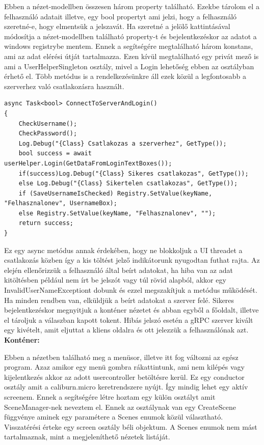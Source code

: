 \documentclass[
]{thesis-ekf}
\theoremstyle{definition}
\theoremstyle{remark}
\begin{document}
Ebben a nézet-modellben összesen három property található. Ezekbe tárolom el a felhasználó adatait illetve, egy bool propertyt ami jelzi, hogy a felhasználó szeretné-e, hogy elmentsük a jelszavát. Ha szeretné a jelölő kattintásával módosítja a nézet-modellben található property-t és bejelentkezéskor az adatot a windows registrybe mentem. Ennek a segítségére megtalálható három konstans, ami az adat elérési útját tartalmazza. Ezen kívül megtalálható egy privát mező is ami a UserHelperSingleton osztály, mivel a Login lehetőség ebben az osztályban érhető el. Több metódus is a rendelkezésünkre áll ezek közül a legfontosabb a szerverhez való csatlakozásra használt.

\begin{lstlisting}[caption={Bejelentkezés},captionpos=b]
async Task<bool> ConnectToServerAndLogin()
{
	CheckUsername();
	CheckPassword();
	Log.Debug("{Class} Csatlakozas a szerverhez", GetType());
	bool success = await userHelper.Login(GetDataFromLoginTextBoxes());
	if(success)Log.Debug("{Class} Sikeres csatlakozas", GetType());
	else Log.Debug("{Class} Sikertelen csatlakozas", GetType());
	if (SaveUsernameIsChecked) Registry.SetValue(keyName, "Felhasznalonev", UsernameBox);
	else Registry.SetValue(keyName, "Felhasznalonev", "");
	return success;
}
\end{lstlisting}
Ez egy async metódus annak érdekében, hogy ne blokkoljuk a UI threadet a csatlakozás közben így a kis töltést jelző indikátorunk nyugodtan futhat rajta. Az elején ellenőrizzük a felhasználó által beírt adatokat, ha hiba van az adat kitöltésben például nem írt be jelszót vagy túl rövid alapból, akkor egy InvalidUserNameExceptiont dobunk és ezzel megszakítjuk a metódus működését. Ha minden rendben van, elküldjük a beírt adatokat a szerver felé. Sikeres bejelentkezéskor megnyitjuk a konténer nézetet és abban egyből a főoldalt, illetve el tároljuk a válaszban kapott tokent. Hibás jelszó esetén a gRPC szerver kivált egy kivételt, amit eljuttat a kliens oldalra és ott jelezzük a felhasználónak azt.\\
\textbf{Konténer:}

Ebben a nézetben található meg a menüsor, illetve itt fog változni az egész program. Azaz amikor egy menü gombra rákattintunk, ami nem kilépés vagy kijelentkezés akkor az adott usercontroller betöltésre kerül. Ez egy conductor osztály amit a caliburn.micro keretrendszere nyújt. Így mindig lehet egy aktív screenem. Ennek a segítségére létre hoztam egy külön osztályt amit SceneManager-nek neveztem el. Ennek az osztálynak van egy CreateScene függvénye aminek egy paramétere a Scenes enumok közül választható. Visszatérési érteke egy screen osztály béli objektum. A Scenes enumok nem mást tartalmaznak, mint a megjeleníthető nézetek listáját. 
\end{document}
